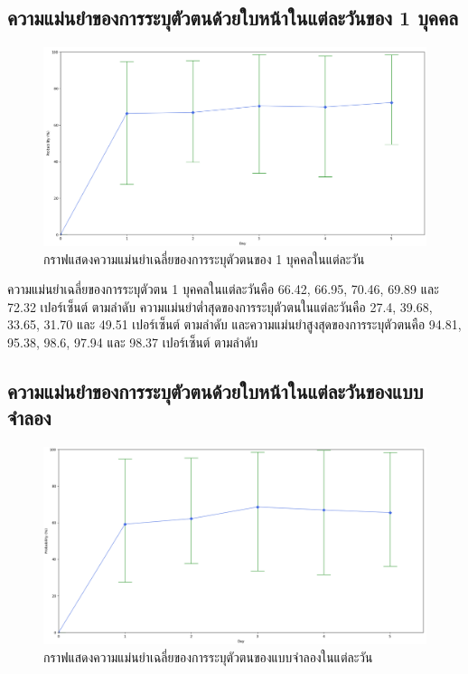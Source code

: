 \subsection{ความแม่นยําของการระบุตัวตนด้วยใบหน้าในแต่ละวันของ 1 บุคคล}

\begin{figure}[!ht]
    \begin{center}
      \includegraphics[scale=.4]{pic/acc_note.png}
      \caption[กราฟแสดงความแม่นยำเฉลี่ยของการระบุตัวตนของ 1 บุคคลในแต่ละวัน]{กราฟแสดงความแม่นยำเฉลี่ยของการระบุตัวตนของ 1 บุคคลในแต่ละวัน}
      \label{fig:face_graph}
    \end{center}
  \end{figure}

\indent ความแม่นยำเฉลี่ยของการระบุตัวตน 1 บุคคลในแต่ละวันคือ 66.42, 66.95, 70.46, 69.89 และ 72.32 เปอร์เซ็นต์ ตามลำดับ ความแม่นยำต่ำสุดของการระบุตัวตนในแต่ละวันคือ 27.4, 39.68, 33.65, 31.70 และ 49.51 เปอร์เซ็นต์ 
ตามลำดับ และความแม่นยำสูงสุดของการระบุตัวตนคือ 94.81, 95.38, 98.6, 97.94 และ 98.37 เปอร์เซ็นต์ ตามลำดับ

\subsection{ความแม่นยําของการระบุตัวตนด้วยใบหน้าในแต่ละวันของแบบจำลอง}
\begin{figure}[!ht]
    \begin{center}
      \includegraphics[scale=.4]{pic/acc_all.png}
      \caption[กราฟแสดงความแม่นยำเฉลี่ยของการระบุตัวตนของแบบจำลองในแต่ละวัน]{กราฟแสดงความแม่นยำเฉลี่ยของการระบุตัวตนของแบบจำลองในแต่ละวัน}
      \label{fig:face_graph_all}
    \end{center}
  \end{figure}


